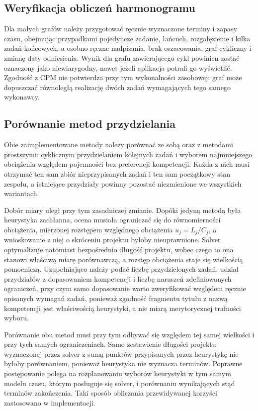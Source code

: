 \subsection{Weryfikacja obliczeń harmonogramu}

Dla małych grafów należy przygotować ręcznie wyznaczone terminy i zapasy czasu, obejmując przypadkami pojedyncze zadanie, łańcuch, rozgałęzienie i kilka zadań końcowych, a osobno ręczne nadpisania, brak oszacowania, graf cykliczny i zmianę daty odniesienia. Wynik dla grafu zawierającego cykl powinien zostać oznaczony jako niewiarygodny, nawet jeżeli aplikacja potrafi go wyświetlić. Zgodność z CPM nie potwierdza przy tym wykonalności zasobowej: graf może dopuszczać równoległą realizację dwóch zadań wymagających tego samego wykonawcy.

\subsection{Porównanie metod przydzielania}

Obie zaimplementowane metody należy porównać ze sobą oraz z metodami prostszymi: cyklicznym przydzielaniem kolejnych zadań i wyborem najmniejszego obciążenia względem pojemności bez preferencji kompetencji. Każda z nich musi otrzymać ten sam zbiór nieprzypisanych zadań i ten sam początkowy stan zespołu, a istniejące przydziały powinny pozostać niezmienione we wszystkich wariantach.

Dobór miary uległ przy tym zasadniczej zmianie. Dopóki jedyną metodą była heurystyka zachłanna, ocena musiała ograniczać się do równomierności obciążenia, mierzonej rozstępem względnego obciążenia \(u_j=L_j/C_j\), a wnioskowanie z niej o skróceniu projektu byłoby nieuprawnione. Solver optymalizuje natomiast bezpośrednio długość projektu, wobec czego to ona stanowi właściwą miarę porównawczą, a rozstęp obciążenia staje się wielkością pomocniczą. Uzupełniająco należy podać liczbę przydzielonych zadań, udział przydziałów z dopasowaniem kompetencji i liczbę naruszeń zdefiniowanych ograniczeń, przy czym samo dopasowanie warto zweryfikować względem ręcznie opisanych wymagań zadań, ponieważ zgodność fragmentu tytułu z nazwą kompetencji jest właściwością heurystyki, a nie miarą merytorycznej trafności wyboru.

Porównanie obu metod musi przy tym odbywać się względem tej samej wielkości i przy tych samych ograniczeniach. Samo zestawienie długości projektu wyznaczonej przez solver z sumą punktów przypisanych przez heurystykę nie byłoby porównaniem, ponieważ heurystyka nie wyznacza terminów. Poprawne postępowanie polega na rozplanowaniu wyborów heurystyki w tym samym modelu czasu, którym posługuje się solver, i porównaniu wynikających stąd terminów zakończenia. Taki sposób obliczania przewidywanej korzyści zastosowano w implementacji.

